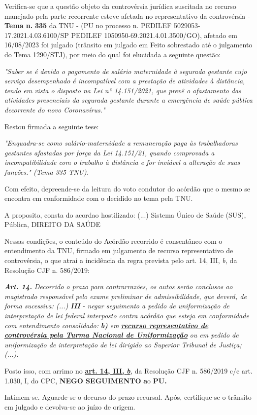 \documentclass[12pt]{article}
\begin{document}
\justifying
\noindent Verifica-se que a questão objeto da controvérsia jurídica suscitada no recurso manejado pela parte recorrente esteve afetada no representativo da controvérsia - \textbf{Tema n. }\textbf{335} da TNU - (PU no processo n. PEDILEF 5029053-17.2021.4.03.6100/SP PEDILEF 1050950-69.2021.4.01.3500/GO),  afetado em 16/08/2023 foi julgado (trânsito em julgado em Feito sobrestado até o julgamento do Tema 1290/STJ), por meio do qual foi elucidada a seguinte questão:

\noindent \textit{"Saber se é devido o pagamento de salário maternidade à segurada gestante cujo serviço desempenhado é incompatível com a prestação de atividades à distância, tendo em vista o disposto na Lei nº 14.151/2021, que prevê o afastamento das atividades presenciais da segurada gestante durante a emergência de saúde pública decorrente do novo Coronavírus."}

\noindent Restou firmada a seguinte tese:

\noindent \textit{"Enquadra-se como salário-maternidade a remuneração paga às trabalhadoras gestantes afastadas por força da Lei 14.151/21, quando comprovada a incompatibilidade com o trabalho à distância e for inviável a alteração de suas funções." (Tema 335 TNU).}

\noindent Com efeito, depreende-se da leitura do voto condutor do acórdão que o mesmo se encontra em conformidade com o decidido no  tema pela TNU.

\noindent A proposito, consta do acordao hostilizado: (...) Sistema Único de Saúde (SUS), Pública, DIREITO DA SAÚDE

\noindent Nessas condições, o conteúdo do Acórdão recorrido é consentâneo com o entendimento da TNU, firmado em julgamento de recurso representativo de controvérsia, o que atrai a incidência da regra prevista pelo art. 14, III, \textit{b,} da Resolução CJF n. 586/2019:

\noindent \textit{\textbf{Art. 14.}}\textit{ Decorrido o prazo para contrarrazões, os autos serão conclusos ao magistrado responsável pelo exame preliminar de admissibilidade, que deverá, de forma sucessiva: (...) }\textit{\textbf{III }}\textit{- negar seguimento a pedido de uniformização de interpretação de lei federal interposto contra acórdão que esteja em conformidade com entendimento consolidado: }\textit{\textbf{b)}}\textit{ em }\uline{\textit{\textbf{recurso representativo de controvérsia pela Turma Nacional de Uniformização}}}\textit{ ou em pedido de uniformização de interpretação de lei dirigido ao Superior Tribunal de Justiça;(...).}

\noindent Posto isso, com arrimo no \uline{\textbf{art. 14, III, }}\uline{\textit{\textbf{b}}}\textit{,} da Resolução CJF n. 586/2019 c/c art. 1.030, I, do CPC, \textbf{NEGO SEGUIMENTO }\textbf{a}o\textbf{ PU}\textbf{.}

\noindent Intimem-se. Aguarde-se o decurso do prazo recursal. Após, certifique-se o trânsito em julgado e devolva-se ao juízo de origem.
\end{document}
